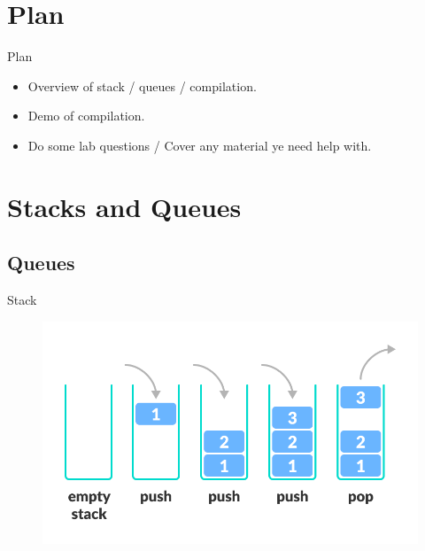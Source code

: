 \documentclass[table,xcolor=table]{IFMG-beamer}
\begin{document}
\setcounter{framenumber}{0}



\section{Plan}

\begin{frame}{Plan}

  \begin{itemize}[<+->]
    \item Overview of stack /  queues / compilation.
    \item Demo of compilation.
    \item Do some lab questions / Cover any material ye need help with.
  \end{itemize}

\end{frame}

\section{Stacks and Queues}
\subsection{Queues}

\begin{frame}{Stack}
  \begin{figure}
    \centering
    \includegraphics[width=0.8\linewidth]{figs/stack.png}
  \end{figure}
\end{frame}
\end{document}
